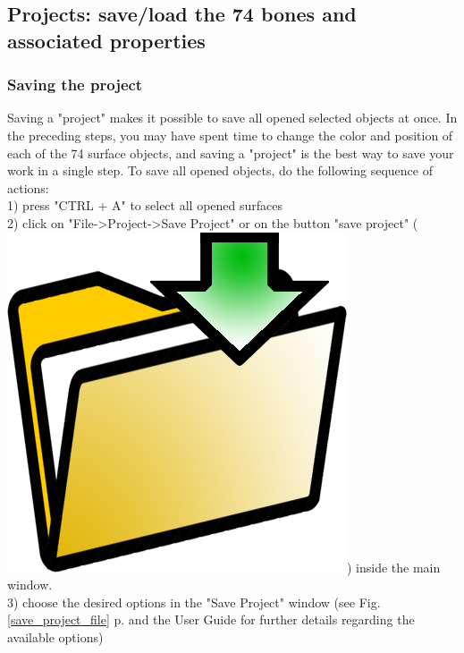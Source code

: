 \documentclass[12pt, a4paper]{book}
\begin{document}
\subsection{Projects: save/load the 74 bones and associated properties}
\subsubsection{Saving the project}
Saving a "project" makes it possible to save all opened selected objects at once. In the preceding steps, you may have spent time to change the color and position of each of the 74 surface objects, and saving a "project" is the best way to save your work in a single step. 
To save all opened objects, do the following sequence of actions:\\
1) press "CTRL + A" to select all opened surfaces\\
2) click on "File->Project->Save Project" or on the button "save project" (\includegraphics[scale=0.03]{../images/03/save_data.png})  inside the main window.\\
3) choose the desired options in the "Save Project" window (see Fig. \ref{save_project_file} p.\pageref{save_project_file} and the User Guide for further details regarding the available options)
\end{document}
